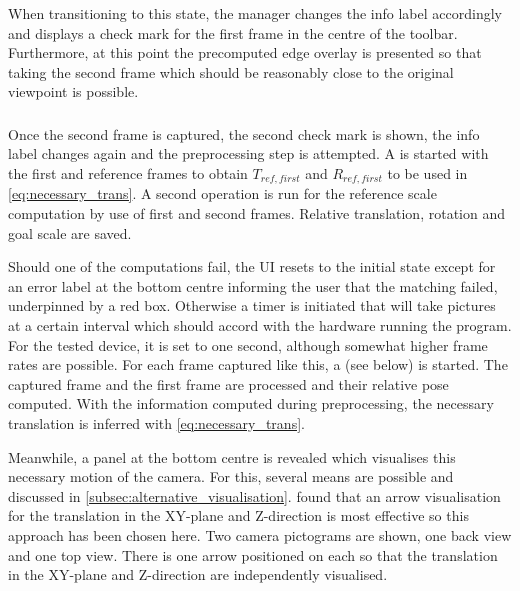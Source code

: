 \subsubsection*{}

When transitioning to this state, the manager changes the info label accordingly
and displays a check mark for the first frame in the centre of the toolbar.
Furthermore, at this point the precomputed edge overlay is presented so that
taking the second frame which should be reasonably close to the original
viewpoint is possible.

\subsubsection*{}

Once the second frame is captured, the second check mark is shown, the info
label changes again and the preprocessing step is attempted. A
 is started with the first and reference
frames to obtain $T_{ref,first}$ and $R_{ref,first}$ to be used in
\eqref{eq:necessary_trans}. A second operation is run for the reference scale
computation by use of first and second frames. Relative translation, rotation
and goal scale are saved.

Should one of the computations fail, the UI resets to the initial state except
for an error label at the bottom centre informing the user that the matching
failed, underpinned by a red box. Otherwise a timer is initiated that will take pictures at a certain
interval which should accord with the hardware running the program. For the
tested device, it is set to one second, although somewhat higher frame rates are
possible. For each frame captured like this, a
 (see below) is started. The captured
frame and the first frame are processed and their relative pose computed. With
the information computed during preprocessing, the necessary translation is
inferred with \eqref{eq:necessary_trans}.

Meanwhile, a panel at the bottom centre is revealed which visualises this
necessary motion of the camera. For this, several means are possible and
discussed in \autoref{subsec:alternative_visualisation}.
\citet{bae2010} found that an arrow visualisation for the translation in the
XY-plane and Z-direction is most effective so this approach has been chosen
here. Two camera pictograms are shown, one back view and one top view. There is
one arrow positioned on each so that the translation in the XY-plane and
Z-direction are independently visualised.

